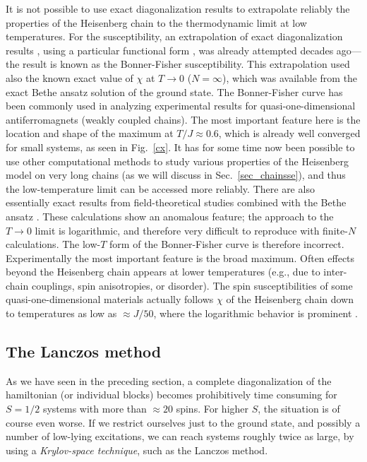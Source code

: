 \documentclass[draft,numberedheadings]{aipproc}
\begin{document}
It is not possible to use exact diagonalization results to extrapolate reliably the properties of the Heisenberg chain to the thermodynamic limit at low 
temperatures. For the susceptibility, an extrapolation of exact diagonalization results \cite{bonnerfisher}, using a particular functional form \cite{estes}, 
was already attempted decades ago---the result is known as the Bonner-Fisher susceptibility. This extrapolation used also the known exact value of $\chi$ at 
$T \to 0$ ($N=\infty$), which was available from the exact Bethe ansatz solution of the ground state. The Bonner-Fisher curve has been commonly used in analyzing 
experimental results for quasi-one-dimensional antiferromagnets (weakly coupled chains). The most important feature here is the location and shape of the 
maximum at $T/J \approx 0.6$, which is already well converged for small systems, as seen in Fig.~\ref{cx}. It has for some time now been possible to use other 
computational methods to study various properties of the Heisenberg model on very long chains (as we will discuss in Sec.~\ref{sec_chainsse}), and thus 
the low-temperature limit can be accessed more reliably. There are also essentially exact results from field-theoretical studies combined with the Bethe 
ansatz \cite{eggert94}. These calculations show an anomalous feature; the approach to the $T \to 0$ limit is logarithmic, and therefore very 
difficult to reproduce with finite-$N$ calculations. The low-$T$ form of the Bonner-Fisher curve is therefore incorrect. Experimentally the most important
feature is the broad maximum. Often effects beyond the Heisenberg chain appears at lower temperatures
(e.g., due to inter-chain couplings, spin anisotropies, or disorder). The spin susceptibilities of some quasi-one-dimensional materials actually follows 
$\chi$ of the Heisenberg chain down to temperatures as low as $\approx J/50$, where the logarithmic behavior is prominent \cite{eggert96}.

\subsection{The Lanczos method}
\label{lanczos}

As we have seen in the preceding section, a complete diagonalization of the hamiltonian (or individual blocks) becomes prohibitively time consuming
for $S=1/2$ systems with more than $\approx 20$ spins. For higher $S$, the situation is of course even worse. If we restrict ourselves just to the ground
state, and possibly a number of low-lying excitations, we can reach systems roughly twice as large, by using a {\it Krylov-space technique}, such as the
Lanczos method. 
\end{document}
